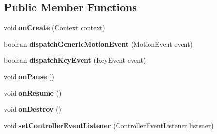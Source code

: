 \subsection*{Public Member Functions}
\begin{DoxyCompactItemize}
\item 
\mbox{\label{classorg_1_1cocos2dx_1_1lib_1_1GameControllerOuya_a59d64b8ac9c7efcf393af58e098c7a06}} 
void {\bfseries on\+Create} (Context context)
\item 
\mbox{\label{classorg_1_1cocos2dx_1_1lib_1_1GameControllerOuya_ade8287bff579ccc824643256697064e2}} 
boolean {\bfseries dispatch\+Generic\+Motion\+Event} (Motion\+Event event)
\item 
\mbox{\label{classorg_1_1cocos2dx_1_1lib_1_1GameControllerOuya_a10989a5fc6776d5a48538cbace530bab}} 
boolean {\bfseries dispatch\+Key\+Event} (Key\+Event event)
\item 
\mbox{\label{classorg_1_1cocos2dx_1_1lib_1_1GameControllerOuya_a7974849834d9de7a76696ca81495d8a0}} 
void {\bfseries on\+Pause} ()
\item 
\mbox{\label{classorg_1_1cocos2dx_1_1lib_1_1GameControllerOuya_aac94f365014607611e6e37a29aecea5d}} 
void {\bfseries on\+Resume} ()
\item 
\mbox{\label{classorg_1_1cocos2dx_1_1lib_1_1GameControllerOuya_aa3b88113b8907f9ed8fdaadde7d51de8}} 
void {\bfseries on\+Destroy} ()
\item 
\mbox{\label{classorg_1_1cocos2dx_1_1lib_1_1GameControllerOuya_a6d373a816ad5b7b2b5441ce363483f3e}} 
void {\bfseries set\+Controller\+Event\+Listener} (\hyperlink{interfaceorg_1_1cocos2dx_1_1lib_1_1GameControllerDelegate_1_1ControllerEventListener}{Controller\+Event\+Listener} listener)
\item 
\mbox{\label{classorg_1_1cocos2dx_1_1lib_1_1GameControllerOuya_a59d64b8ac9c7efcf393af58e098c7a06}} 

\end{DoxyCompactItemize}
